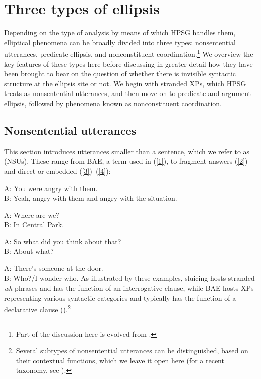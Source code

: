 {%


\section{Three types of ellipsis}
\label{sec-three-types-of-ellipsis}

Depending on the type of analysis by means of which HPSG handles them, elliptical phenomena can be broadly divided into three types:
         nonsentential utterances, predicate ellipsis, and nonconstituent coordination.\footnote{Part of the discussion here is evolved from \citet{Kim2020}.}
          We overview the key features of these types here before discussing in greater detail how they have been brought to bear on the question of whether there is invisible syntactic structure at the ellipsis site or not. We begin with stranded XPs, which HPSG treats as nonsentential utterances, and then move on to predicate and argument ellipsis, followed by phenomena known as nonconstituent coordination.


\subsection{Nonsentential utterances}
This section introduces utterances smaller than a sentence, which we refer to as \emph{} (NSUs). These range from \emph{} BAE, a term used in \citealt{CJ2005a} (\ref{1}), to fragment answers (\ref{2})
and direct or embedded  (\ref{3})--(\ref{4}):

\ea A: You were angry with them.\\ B: Yeah, angry with them and angry with the situation.\label{1}\z

\ea A: Where are we? \\B: In Central Park.\label{2}\z

\ea A: So what did you think about that?\\ B: About what? \label{3}\z

\ea A: There's someone at the door. \\B: Who?/I wonder who. \label{4}\z
%
As illustrated by these examples, sluicing hosts stranded \emph{wh}-phrases and has the function of an interrogative clause, while BAE hosts XPs representing various syntactic categories and typically has the function of a declarative clause (\citealt{Ginzburg:Sag:2000,CJ2005a}).\footnote{Several subtypes of nonsentential utterances can be distinguished, based on their contextual functions, which we leave it open here (for a recent taxonomy, see \citealt[217]{Ginzburg2012}).}

}

